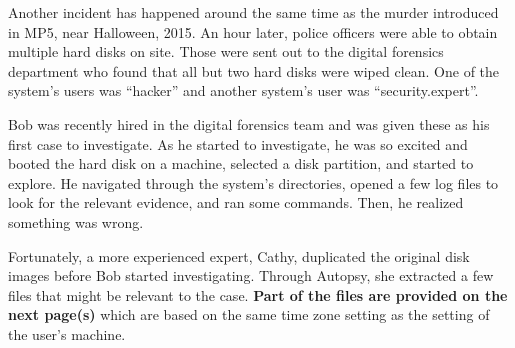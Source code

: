 \documentclass[addpoints]{exam}
\begin{document}
\begin{questions}

\pagebreak



\pagebreak


Another incident has happened around the same time as the murder introduced
in MP5, near Halloween, 2015. An hour later, police officers were able to obtain 
multiple hard disks on site. Those were sent out to the digital forensics 
department who found that all but two hard disks were wiped clean. One of the 
system's users was ``hacker'' and another system's user was ``security.expert''. 

Bob was recently hired in the digital forensics team and was given these as his 
first case to investigate. As he started to investigate, he was so excited and 
booted the hard disk on a machine, selected a disk partition, and started to 
explore. He navigated through the system's directories, opened a few log files 
to look for the relevant evidence, and ran some commands. Then, he realized
something was wrong.

Fortunately, a more experienced expert, Cathy, duplicated the original
disk images before Bob started investigating. Through Autopsy, she
extracted a few files that might be relevant to the case. \textbf{Part
of the files are provided on the next page(s)} which are based on
the same time zone setting as the setting of the user's machine.


\end{questions}
\end{document}
